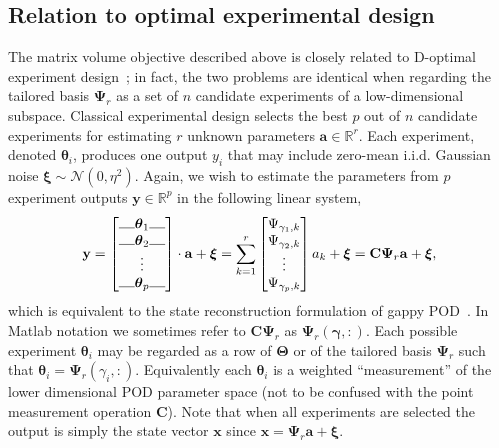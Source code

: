 \documentclass[letterpaper]{IEEEtran}
\newcommand{\ba}{\mathbf{a}}
\newcommand{\bx}{\mathbf{x}}
\newcommand{\by}{\mathbf{y}}
\newcommand{\bC}{\mathbf{C}}
\newcommand{\bPsi}{\mathbf{\Psi}}
\newcommand{\bTheta}{\mathbf{\Theta}}
\newcommand{\reals}{\mathbb{R}}
\newcommand{\btheta}{\boldsymbol{\theta}}
\newcommand{\ind}{\gamma}
\newcommand{\Ind}{\boldsymbol{\gamma}}
\begin{document}
\subsection{Relation to optimal experimental design}
The matrix volume objective described above is closely related to D-optimal experiment design~\cite{doptimal}; in fact, the two problems are identical when regarding the tailored basis $\bPsi_r$ as a set of $n$ candidate experiments of a low-dimensional subspace. Classical experimental design selects the best $p$ out of $n$ candidate experiments for estimating $r$ unknown parameters $\ba \in \reals^r$. Each experiment, denoted $\btheta_i$, produces one output $y_i$ that may include zero-mean i.i.d. Gaussian noise $\boldsymbol{\xi}\sim \mathcal{N}(0,\eta^2)$. Again, we wish to estimate the parameters from $p$ experiment outputs $\by\in\reals^p$ in the following linear system,
\begin{equation}
\label{eqn:doe_est}
\by = \begin{bmatrix}
\rule{0.4cm}{0.4pt} \btheta_{1}\rule{0.4cm}{0.4pt} \\
\rule{0.4cm}{0.4pt} \btheta_{2}\rule{0.4cm}{0.4pt}  \\ 
\vdots \\
\rule{0.4cm}{0.4pt} \btheta_{p}\rule{0.4cm}{0.4pt} 
\end{bmatrix}
\cdot \ba + \boldsymbol{\xi} = 
\sum_{k=1}^r\begin{bmatrix}
\Psi_{\ind_1,k}  \\
 \Psi_{\ind_2,k} \\ 
\vdots \\
 \Psi_{\ind_p,k} 
\end{bmatrix}a_k + \boldsymbol{\xi}
 =
\bC\bPsi_r\ba + \boldsymbol{\xi},
\end{equation}
which is equivalent to the state reconstruction formulation of gappy POD~\cite{Everson1995gappy}. In Matlab notation we sometimes refer to $\bC\bPsi_r$ as $\bPsi_r(\Ind,:)$.
Each possible experiment $\btheta_i$ may be regarded as a row of $\bTheta$ or of the tailored basis $\bPsi_r$ such that $\btheta_i = \bPsi_r(\ind_i,:)$.
Equivalently each $\btheta_i$ is a weighted ``measurement'' of the lower dimensional POD parameter space (not to be confused with the point measurement operation $\bC$). Note that when all experiments are selected the output is simply the state vector $\bx$ since $\bx = \bPsi_r\ba+\boldsymbol{\xi}$.
\end{document}
